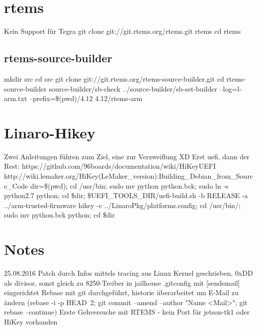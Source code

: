 \section{rtems}
Kein Support für Tegra
git clone git://git.rtems.org/rtems.git rtems 
cd rtems
\subsection{rtems-source-builder}
mkdir src
cd src
git clone git://git.rtems.org/rtems-source-builder.git
cd rtems-source-builder
source-builder/sb-check
../source-builder/sb-set-builder --log=l-arm.txt --prefix=\$(pwd)/4.12 4.12/rtems-arm

\section{Linaro-Hikey}
Zwei Anleitungen führen zum Ziel, eine zur Verzweiflung XD
Erst uefi, dann der Rest:
https://github.com/96boards/documentation/wiki/HiKeyUEFI
http://wiki.lemaker.org/HiKey(LeMaker\_version):Building\_Debian\_from\_Source\_Code
dir=\$(pwd); cd /usr/bin; sudo mv python python.bck; sudo ln -s python2.7 python; cd \$dir; \${UEFI\_TOOLS\_DIR}/uefi-build.sh -b RELEASE -a ../arm-trusted-firmware hikey -c ../LinaroPkg/platforms.config; cd /usr/bin/; sudo mv python.bck python; cd \$dir

\section{Notes}
25.08.2016 Patch durch Infos mittels tracing aus Linux Kernel geschrieben, 0xDD als divisor, sonst gleich zu 8250-Treiber in jailhouse
.gitconfig mit [sendemail] eingerichtet
Rebase mit git durchgeführt, historie überarbeitet um E-Mail zu ändern (rebase -i -p HEAD~2; git commit --amend --author "Name <Mail>"; git rebase --continue)
Erste Gehversuche mit RTEMS - kein Port für jetson-tk1 oder HiKey vorhanden
